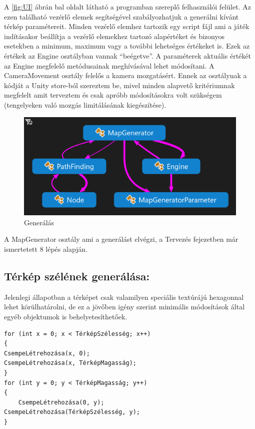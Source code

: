 \noindent A \ref{fig:UI} ábrán bal oldalt látható a programban szereplő felhasználói felület. Az ezen található vezérlő elemek segítségével szabályozhatjuk a generálni kívánt térkép paramétereit. Minden vezérlő elemhez tartozik egy script fájl ami a játék indításakor beállítja a vezérlő elemekhez tartozó alapértéket és bizonyos esetekben a minimum, maximum vagy a további lehetséges értékeket is. Ezek az értékek az Engine osztályban vannak “beégetve”. A paraméterek aktuális értékét az Engine megfelelő metódusainak meghívásával lehet módosítani.
\newline
\newline A CameraMovement osztály felelős a kamera mozgatásért. Ennek az osztálynak a kódját a Unity store-ból szereztem be, mivel minden alapvető kritériumnak megfelelt amit terveztem és csak apróbb módosításokra volt szükségem (tengelyeken való mozgás limitálásának kiegészítése). 

\begin{figure}[h!]
\centering
\includegraphics[scale=0.4]{kepek/generalas.png}
\caption{Generálás}
\label{fig:generalas}
\end{figure}

\noindent A MapGenerator osztály ami a generálást elvégzi, a Tervezés fejezetben már ismertetett 8 lépés alapján.

\subsection{Térkép szélének generálása:}

Jelenlegi állapotban a térképet csak valamilyen speciális textúrájú hexagonnal lehet körülhatárolni, de ez a jövőben igény szerint minimális módosítások által egyéb objektumok is behelyetesíthetőek. 

\begin{verbatim}
for (int x = 0; x < TérképSzélesség; x++)
{
CsempeLétrehozása(x, 0);
CsempeLétrehozása(x, TérképMagasság);
}
for (int y = 0; y < TérképMagasság; y++)
{
	CsempeLétrehozása(0, y);
CsempeLétrehozása(TérképSzélesség, y);
}
\end{verbatim}

